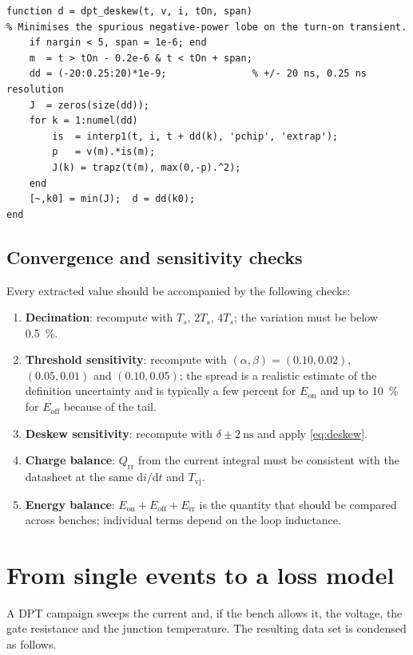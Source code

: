 \documentclass[11pt,a4paper]{article}
\newcommand{\Eon}{E_{\mathrm{on}}}
\newcommand{\Eoff}{E_{\mathrm{off}}}
\newcommand{\Err}{E_{\mathrm{rr}}}
\begin{document}
\begin{lstlisting}[caption={Software deskew estimate based on the non-negative power criterion.}]
function d = dpt_deskew(t, v, i, tOn, span)
% Minimises the spurious negative-power lobe on the turn-on transient.
    if nargin < 5, span = 1e-6; end
    m  = t > tOn - 0.2e-6 & t < tOn + span;
    dd = (-20:0.25:20)*1e-9;               % +/- 20 ns, 0.25 ns resolution
    J  = zeros(size(dd));
    for k = 1:numel(dd)
        is  = interp1(t, i, t + dd(k), 'pchip', 'extrap');
        p   = v(m).*is(m);
        J(k) = trapz(t(m), max(0,-p).^2);
    end
    [~,k0] = min(J);  d = dd(k0);
end
\end{lstlisting}

\subsection{Convergence and sensitivity checks}

Every extracted value should be accompanied by the following checks:
\begin{enumerate}
\item \textbf{Decimation}: recompute with $T_s$, $2T_s$, $4T_s$; the variation must be
below \SI{0.5}{\percent}.
\item \textbf{Threshold sensitivity}: recompute with $(\alpha,\beta)=(0.10,0.02)$,
$(0.05,0.01)$ and $(0.10,0.05)$; the spread is a realistic estimate of the definition
uncertainty and is typically a few percent for $\Eon$ and up to \SI{10}{\percent} for
$\Eoff$ because of the tail.
\item \textbf{Deskew sensitivity}: recompute with $\delta \pm \SI{2}{\nano\second}$ and
apply \eqref{eq:deskew}.
\item \textbf{Charge balance}: $Q_{\mathrm{rr}}$ from the current integral must be
consistent with the datasheet at the same $\mathrm{d}i/\mathrm{d}t$ and $T_{\mathrm{vj}}$.
\item \textbf{Energy balance}: $\Eon+\Eoff+\Err$ is the quantity that should be compared
across benches; individual terms depend on the loop inductance.
\end{enumerate}

\section{From single events to a loss model}

A DPT campaign sweeps the current and, if the bench allows it, the voltage, the gate
resistance and the junction temperature. The resulting data set is condensed as follows.
\end{document}
